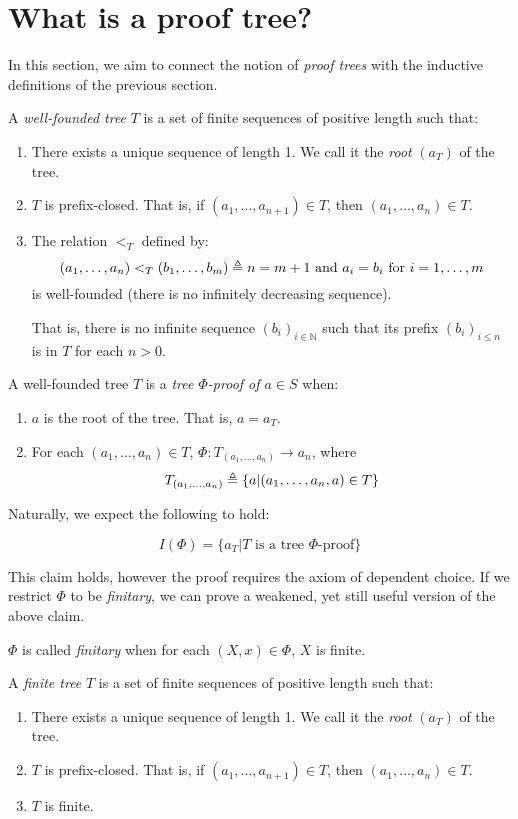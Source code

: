 \documentclass[12pt]{article}
\begin{document}
\section{What is a proof tree?}
In this section, we aim to connect the notion of \emph{proof trees} with the inductive definitions of the previous section.
\begin{definition}
	A \emph{well-founded tree} $T$ is a set of finite sequences of positive length such that:
	\begin{enumerate}
		\item There exists a unique sequence of length 1. We call it the \emph{root} $(a_T)$ of the tree.
		\item $T$ is prefix-closed. That is, if $(a_1,\dots,a_{n+1})\in T$, then $(a_1,\dots,a_n)\in T$.
		\item The relation $<_T$ defined by:
		      \[(a_1,\dots,a_n)<_T(b_1,\dots,b_m)\triangleq n=m+1\text{ and }a_i=b_i\text{ for }i=1,\dots,m\]
		      is well-founded (there is no infinitely decreasing sequence).

		      That is, there is no infinite sequence $(b_i)_{i\in\mathbb{N}}$ such that its prefix $(b_i)_{i\le n}$ is in $T$ for each $n>0$.
	\end{enumerate}
\end{definition}
\begin{definition}
	A well-founded tree $T$ is a \emph{tree $\Phi$-proof of $a\in S$} when:
	\begin{enumerate}
		\item $a$ is the root of the tree. That is, $a=a_T$.
		\item For each $(a_1,\dots,a_n)\in T$, $\Phi:T_{(a_1,\dots,a_n)}\rightarrow a_n$, where
		      \[T_{(a_1,\dots,a_n)}\triangleq\{a|(a_1,\dots,a_n,a)\in T\}\]
	\end{enumerate}
\end{definition}
Naturally, we expect the following to hold:
\begin{claim}
	\[I(\Phi)=\{a_T|T\text{ is a tree }\Phi\text{-proof}\}\]
\end{claim}
This claim holds, however the proof requires the axiom of dependent choice.
If we restrict $\Phi$ to be \emph{finitary}, we can prove a weakened, yet still useful version of the above claim.
\begin{definition}
	$\Phi$ is called \emph{finitary} when for each $(X,x)\in\Phi$, $X$ is finite.
\end{definition}
\begin{definition}
	A \emph{finite tree} $T$ is a set of finite sequences of positive length such that:
	\begin{enumerate}
		\item There exists a unique sequence of length 1. We call it the \emph{root} $(a_T)$ of the tree.
		\item $T$ is prefix-closed. That is, if $(a_1,\dots,a_{n+1})\in T$, then $(a_1,\dots,a_n)\in T$.
		\item $T$ is finite.
	\end{enumerate}
\end{definition}
\end{document}
